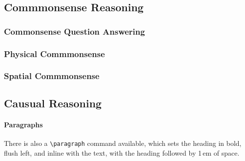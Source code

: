 \subsection{Commmonsense Reasoning}

\subsubsection{Commonsense Question Answering}




\subsubsection{Physical Commmonsense}



\subsubsection{Spatial Commmonsense}




\subsection{Causual Reasoning}







\paragraph{Paragraphs}


There is also a \verb+\paragraph+ command available, which sets the heading in
bold, flush left, and inline with the text, with the heading followed by 1\,em
of space.
